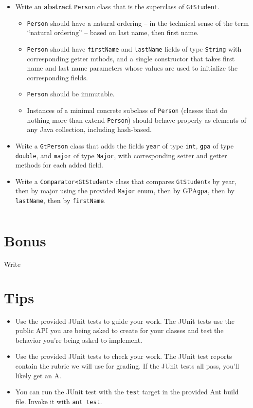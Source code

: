 \documentclass[12pt]{article}
\begin{document}
\begin{itemize}
\item Write an {\bf abstract} {\tt Person} class that is the superclass of {\tt GtStudent}.
\begin{itemize}
\item {\tt Person} should have a natural ordering -- in the technical sense of the term ``natural ordering'' --  based on last name, then first name.
\item {\tt Person} should have {\tt firstName} and {\tt lastName} fields of type {\tt String} with corresponding getter mthods, and a single constructor that takes first name and last name parameters whose values are used to initialize the corresponding fields.
\item {\tt Person} should be immutable.
\item Instances of a minimal concrete subclass of {\tt Person} (classes that do nothing more than extend {\tt Person}) should behave properly as elements of any Java collection, including hash-based.
\end{itemize}
\item Write a {\tt GtPerson} class that adds the fields {\tt year} of type {\tt int}, {\tt gpa} of type {\tt double}, and {\tt major} of type {\tt Major}, with corresponding setter and getter methods for each added field.
\item Write a {\tt Comparator<GtStudent>} class that compares {\tt GtStudent}s by year, then by major using the provided {\tt Major} enum, then by GPA{\tt gpa}, then by {\tt lastName}, then by {\tt firstName}.
\end{itemize}

\begin{lstlisting}[language=bash]

\end{lstlisting}

\section{Bonus}

Write

\section{Tips}

\begin{itemize}
\item Use the provided JUnit tests to guide your work.  The JUnit tests use the public API you are being asked to create for your classes and test the behavior you're being asked to implement.
\item Use the provided JUnit tests to check your work.  The JUnit test reports contain the rubric we will use for grading.  If the JUnit tests all pass, you'll likely get an A.
\item You can run the JUnit test with the {\tt test} target in the provided Ant build file.  Invoke it with {\tt ant test}.
\end{itemize}
\end{document}
